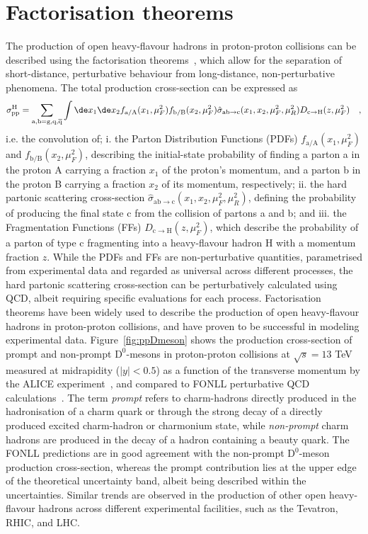 \section{Factorisation theorems}
The production of open heavy-flavour hadrons in proton-proton collisions can be described using the factorisation theorems~\cite{Collins:1989gx}, which allow for the separation of short-distance, perturbative behaviour from long-distance, non-perturbative phenomena. The total production cross-section can be expressed as
\begin{equation*}
    \sigma_{\text{pp}}^\mathrm{H} = \sum_\mathrm{a,b = g, q, \overline{q}} \int \de x_1 \de x_2 f_\mathrm{a/A}(x_1,\mu_F^2) f_\mathrm{b/B}(x_2,\mu_F^2) \hat{\sigma}_\mathrm{ab \rightarrow c} (x_1,x_2,\mu_F^2,\mu_R^2) D_\mathrm{c\rightarrow H}(z,\mu_F^2) \quad ,
\end{equation*}
i.e. the convolution of; i. the Parton Distribution Functions (PDFs) $f_\mathrm{a/A}(x_1,\mu_F^2)$ and $f_\mathrm{b/B}(x_2,\mu_F^2)$, describing the initial-state probability of finding a parton a in the proton A carrying a fraction $x_1$ of the proton's momentum, and a parton b in the proton B carrying a fraction $x_2$ of its momentum, respectively; ii. the hard partonic scattering cross-section $\hat{\sigma}_\mathrm{ab \rightarrow c} (x_1,x_2,\mu_F^2,\mu_R^2)$, defining the probability of producing the final state c from the collision of partons a and b; and iii. the Fragmentation Functions (FFs) $D_\mathrm{c\rightarrow H}(z,\mu_F^2)$, which describe the probability of a parton of type c fragmenting into a heavy-flavour hadron H with a momentum fraction $z$. While the PDFs and FFs are non-perturbative quantities, parametrised from experimental data and regarded as universal across different processes, the hard partonic scattering cross-section can be perturbatively calculated using QCD, albeit requiring specific evaluations for each process. Factorisation theorems have been widely used to describe the production of open heavy-flavour hadrons in proton-proton collisions, and have proven to be successful in modeling experimental data. Figure~\ref{fig:ppDmeson} shows the production cross-section of prompt and non-prompt $\mathrm{D^0}$-mesons in proton-proton collisions at $\sqrt{s} = 13$ TeV measured at midrapidity ($\lvert y\rvert<0.5$) as a function of the transverse momentum by the ALICE experiment~\cite{ALICE:2021mgk}, and compared to FONLL perturbative QCD calculations~\cite{Cacciari:1998it}. The term \emph{prompt} refers to charm-hadrons directly produced in the hadronisation of a charm quark or through the strong decay of a directly produced excited charm-hadron or charmonium state, while \emph{non-prompt} charm hadrons are produced in the decay of a hadron containing a beauty quark. The FONLL predictions are in good agreement with the non-prompt $\mathrm{D^0}$-meson production cross-section, whereas the prompt contribution lies at the upper edge of the theoretical uncertainty band, albeit being described within the uncertainties. Similar trends are observed in the production of other open heavy-flavour hadrons across different experimental facilities, such as the Tevatron, RHIC, and LHC.
